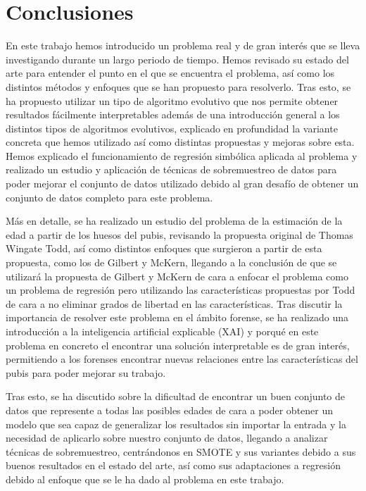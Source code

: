 \section{Conclusiones}

En este trabajo hemos introducido un problema real y de gran interés que se lleva investigando durante un largo periodo de tiempo. Hemos revisado su estado del arte para entender el punto en el que se encuentra el problema, así como los distintos métodos y enfoques que se han propuesto para resolverlo. Tras esto, se ha propuesto utilizar un tipo de algoritmo evolutivo que nos permite obtener resultados fácilmente interpretables además de una introducción general a los distintos tipos de algoritmos evolutivos, explicado en profundidad la variante concreta que hemos utilizado así como distintas propuestas y mejoras sobre esta. Hemos explicado el funcionamiento de regresión simbólica aplicada al problema y realizado un estudio y aplicación de técnicas de sobremuestreo de datos para poder mejorar el conjunto de datos utilizado debido al gran desafío de obtener un conjunto de datos completo para este problema.

Más en detalle, se ha realizado un estudio del problema de la estimación de la edad a partir de los huesos del pubis, revisando la propuesta original de Thomas Wingate Todd, así como distintos enfoques que surgieron a partir de esta propuesta, como los de Gilbert y McKern, llegando a la conclusión de que se utilizará la propuesta de Gilbert y McKern de cara a enfocar el problema como un problema de regresión pero utilizando las características propuestas por Todd de cara a no eliminar grados de libertad en las características. Tras discutir la importancia de resolver este problema en el ámbito forense, se ha realizado una introducción a la inteligencia artificial explicable (XAI) y porqué en este problema en concreto el encontrar una solución interpretable es de gran interés, permitiendo a los forenses encontrar nuevas relaciones entre las características del pubis para poder mejorar su trabajo.

Tras esto, se ha discutido sobre la dificultad de encontrar un buen conjunto de datos que represente a todas las posibles edades de cara a poder obtener un modelo que sea capaz de generalizar los resultados sin importar la entrada y la necesidad de aplicarlo sobre nuestro conjunto de datos, llegando a analizar técnicas de sobremuestreo, centrándonos en SMOTE y sus variantes debido a sus buenos resultados en el estado del arte, así como sus adaptaciones a regresión debido al enfoque que se le ha dado al problema en este trabajo.

